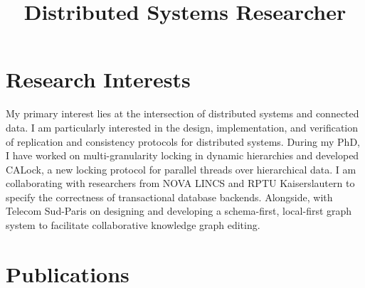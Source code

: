 \documentclass[10pt,a4paper,sans]{moderncv}        %
\title{Distributed Systems Researcher}
\begin{document}
\makecvtitle

\vspace{-1cm}

\section{Research Interests}

My primary interest lies at the intersection of distributed systems and connected data. I am particularly interested in the design, implementation, and verification of replication and consistency protocols for distributed systems. During my PhD, I have worked on multi-granularity locking in dynamic hierarchies and developed CALock, a new locking protocol for parallel threads over hierarchical data. I am collaborating with researchers from NOVA LINCS and RPTU Kaiserslautern to specify the correctness of transactional database backends. Alongside, with Telecom Sud-Paris on designing and developing a schema-first, local-first graph system to facilitate collaborative knowledge graph editing.


\section{Publications}





    
\end{document}
